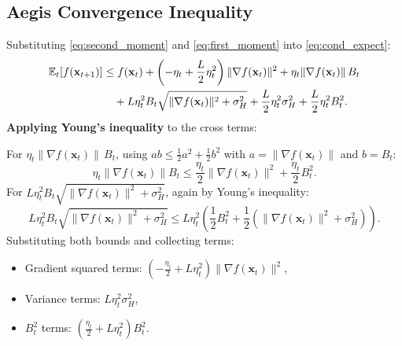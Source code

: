 \documentclass[../main]{subfiles}
\begin{document}
\subsection{Aegis Convergence Inequality}

Substituting \eqref{eq:second_moment} and \eqref{eq:first_moment} into \eqref{eq:cond_expect}:
\begin{align}
    \mathbb{E}_t[f(\mathbf{x}_{t+1})] &\leq f(\mathbf{x}_t)
    + \left(-\eta_t + \frac{L}{2}\eta_t^2\right)\|\nabla f(\mathbf{x}_t)\|^2
    + \eta_t\|\nabla f(\mathbf{x}_t)\|\, B_t \nonumber\\
    &\quad + L\eta_t^2 B_t\sqrt{\|\nabla f(\mathbf{x}_t)\|^2 + \sigma_H^2}
    + \frac{L}{2}\eta_t^2\sigma_H^2
    + \frac{L}{2}\eta_t^2 B_t^2.
    \label{eq:pre_youngs}
\end{align}
\textbf{Applying Young's inequality} to the cross terms:

For $\eta_t\|\nabla f(\mathbf{x}_t)\|\, B_t$, using $ab \leq \frac{1}{2}a^2 + \frac{1}{2}b^2$
with $a = \|\nabla f(\mathbf{x}_t)\|$ and $b = B_t$:
\[
    \eta_t\|\nabla f(\mathbf{x}_t)\| B_t \leq \frac{\eta_t}{2}\|\nabla f(\mathbf{x}_t)\|^2 + \frac{\eta_t}{2} B_t^2.
\]
For $L\eta_t^2 B_t\sqrt{\|\nabla f(\mathbf{x}_t)\|^2 + \sigma_H^2}$, again by Young's inequality:
\[
    L\eta_t^2 B_t\sqrt{\|\nabla f(\mathbf{x}_t)\|^2 + \sigma_H^2}
    \leq L\eta_t^2\left(\frac{1}{2}B_t^2 + \frac{1}{2}(\|\nabla f(\mathbf{x}_t)\|^2 + \sigma_H^2)\right).
\]
Substituting both bounds and collecting terms:
\begin{itemize}
    \item Gradient squared terms: $\left(-\frac{\eta_t}{2} + L\eta_t^2\right)\|\nabla f(\mathbf{x}_t)\|^2$,
    \item Variance terms: $L\eta_t^2\sigma_H^2$,
    \item $B_t^2$ terms: $\left(\frac{\eta_t}{2} + L\eta_t^2\right) B_t^2$.
\end{itemize}
\end{document}
